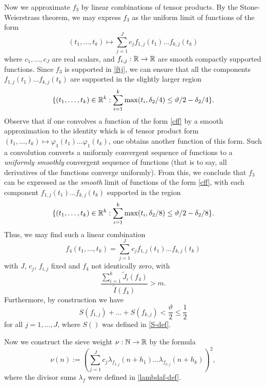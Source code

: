 Now we approximate $f_3$ by linear combinations of tensor products.  By the Stone-Weierstrass theorem, we may express $f_3$ as the uniform limit of functions
of the form
\begin{equation}\label{cff}
 (t_1,\dots,t_k) \mapsto \sum_{j=1}^J c_j f_{1,j}(t_1) \dots f_{k,j}(t_k)
\end{equation}
where $c_1,\dots,c_J$ are real scalars, and $f_{i,j}: \mathbb{R} \to \mathbb{R}$ are smooth compactly supported functions.  Since $f_3$ is supported in \eqref{ftj}, we can ensure that all the components $f_{1,j}(t_1) \dots f_{k,j}(t_k)$ are supported in the slightly larger region
$$ \{ (t_1,\dots,t_k) \in \mathbb{R}^k: \sum_{i=1}^k \max(t_i, \delta_2/4) \leq \vartheta/2 - \delta_2/4 \}.$$
Observe that if one convolves a function of the form \eqref{cff} by a smooth approximation to the identity which is of tensor product form $(t_1,\dots,t_k) \mapsto \varphi_1(t_1) \dots \varphi_1(t_k)$, one obtains another function of this form.  Such a convolution converts a uniformly convergent sequence of functions to a \emph{uniformly smoothly} convergent sequence of functions (that is to say, all derivatives of the functions converge uniformly).  From this, we conclude that $f_3$ can be expressed as the \emph{smooth} limit of functions of the form \eqref{cff}, with each component $f_{1,j}(t_1) \dots f_{k,j}(t_k)$ supported in the region
$$ \{ (t_1,\dots,t_k) \in \mathbb{R}^k: \sum_{i=1}^k \max(t_i, \delta_2/8) \leq \vartheta/2 - \delta_2/8 \}.$$
Thus, we may find such a linear combination
\begin{equation}\label{f4}
 f_4(t_1,\dots,t_k) = \sum_{j=1}^J c_j f_{1,j}(t_1) \dots f_{k,j}(t_k)
\end{equation}
with $J$, $c_j$, $f_{i,j}$ fixed and $f_4$ not identically zero, with
\begin{equation}\label{jbig-6}
 \frac{\sum_{i=1}^k \tilde J_i(f_4)}{\tilde I(f_4)} > m.
\end{equation}
Furthermore, by construction we have
\begin{equation}\label{sfg}
S(f_{1,j}) + \dots + S(f_{k,j}) < \frac{\vartheta}{2} \leq \frac{1}{2}
\end{equation}
for all $j=1,\dots,J$, where $S()$ was defined in \eqref{S-def}.

Now we construct the sieve weight $\nu: \mathbb{N} \to \mathbb{R}$ by the formula
\begin{equation}\label{nu-def}
 \nu(n) := \left( \sum_{j=1}^J c_j \lambda_{f_{1,j}}(n+h_1) \dots \lambda_{f_{k,j}}(n+h_k) \right)^2,
\end{equation}
where the divisor sums $\lambda_f$ were defined in \eqref{lambdaf-def}.

